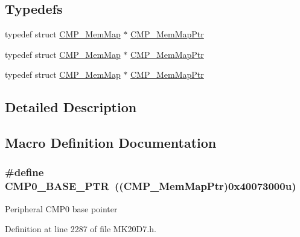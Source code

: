 \subsection*{Typedefs}
\begin{DoxyCompactItemize}
\item 
typedef struct \hyperlink{struct_c_m_p___mem_map}{C\+M\+P\+\_\+\+Mem\+Map} $\ast$ \hyperlink{group___c_m_p___peripheral_ga6f5d370df3839e41b771c2d0b89cbb83}{C\+M\+P\+\_\+\+Mem\+Map\+Ptr}
\item 
typedef struct \hyperlink{struct_c_m_p___mem_map}{C\+M\+P\+\_\+\+Mem\+Map} $\ast$ \hyperlink{group___c_m_p___peripheral_ga6f5d370df3839e41b771c2d0b89cbb83}{C\+M\+P\+\_\+\+Mem\+Map\+Ptr}
\item 
typedef struct \hyperlink{struct_c_m_p___mem_map}{C\+M\+P\+\_\+\+Mem\+Map} $\ast$ \hyperlink{group___c_m_p___peripheral_ga6f5d370df3839e41b771c2d0b89cbb83}{C\+M\+P\+\_\+\+Mem\+Map\+Ptr}
\end{DoxyCompactItemize}


\subsection{Detailed Description}


\subsection{Macro Definition Documentation}
\subsubsection[{\texorpdfstring{C\+M\+P0\+\_\+\+B\+A\+S\+E\+\_\+\+P\+TR}{CMP0_BASE_PTR}}]{\setlength{\rightskip}{0pt plus 5cm}\#define C\+M\+P0\+\_\+\+B\+A\+S\+E\+\_\+\+P\+TR~(({\bf C\+M\+P\+\_\+\+Mem\+Map\+Ptr})0x40073000u)}\hypertarget{group___c_m_p___peripheral_ga5a7a6b1d0743a05435ba5cb2dc2b3431}{}\label{group___c_m_p___peripheral_ga5a7a6b1d0743a05435ba5cb2dc2b3431}
Peripheral C\+M\+P0 base pointer 

Definition at line 2287 of file M\+K20\+D7.\+h.

